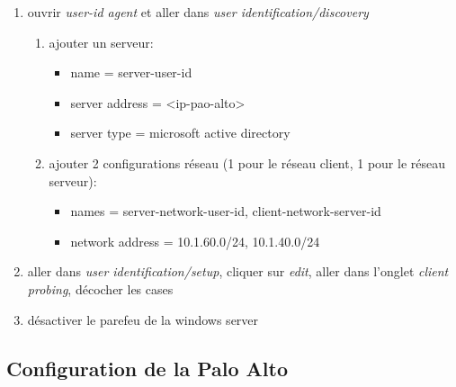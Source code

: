 \documentclass[a4paper]{article}
\begin{document}
\begin{enumerate}
\begin{example}
    \end{example}
    \item ouvrir \textit{user-id agent} et aller dans \textit{user identification/discovery}
    \begin{example}
        \begin{enumerate}
            \item ajouter un serveur:
            \begin{itemize}
                \item name = server-user-id
                \item server address = <ip-pao-alto>
                \item server type = microsoft active directory
            \end{itemize}
            \item ajouter 2 configurations réseau (1 pour le réseau client, 1 pour le réseau serveur):
            \begin{itemize}
                \item names = server-network-user-id, client-network-server-id
                \item network address = 10.1.60.0/24, 10.1.40.0/24
            \end{itemize}
        \end{enumerate}
    \end{example}
    \item aller dans \textit{user identification/setup}, cliquer sur \textit{edit}, aller dans l'onglet \textit{client probing}, décocher les cases
    \item désactiver le parefeu de la windows server
\end{enumerate}










\subsection{Configuration de la Palo Alto}
\end{document}
